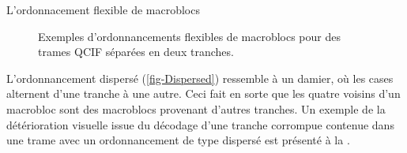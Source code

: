 \begin{section}{L'ordonnacement flexible de macroblocs}
\begin{figure}
	\caption[Ordonnancement flexible de macrobloc de trames QCIF]{Exemples
d'ordonnancements flexibles de macroblocs pour des trames QCIF séparées en deux
tranches.}
	\label{fig-FMO}
\end{figure}

L'ordonnancement dispersé (\ref{fig-Dispersed}) ressemble à un damier, où les
cases alternent d'une tranche à une autre. Ceci fait en sorte que les quatre
voisins d'un macrobloc sont des macroblocs provenant d'autres tranches. Un
exemple de la détérioration visuelle issue du décodage d'une tranche corrompue
contenue dans une trame avec un ordonnancement de type dispersé est présenté à
la . 


\end{section}
